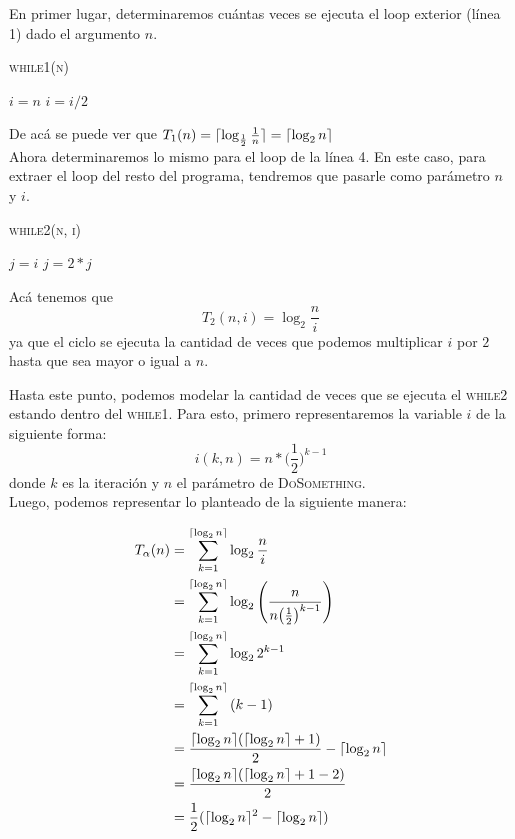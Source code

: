 \documentclass[12pt]{article}
\DeclarePairedDelimiter{\ceil}{\lceil}{\rceil}
\begin{document}
En primer lugar, determinaremos cuántas veces se ejecuta el loop exterior (línea 1) dado el argumento $n$. \\

\begin{algorithm}
\caption{\textsc{while1(n)}}
\begin{algorithmic}[1]
    \State $i = n$
        \State $i = i/2$
    \EndWhile
\end{algorithmic}
\end{algorithm}

De acá se puede ver que $T_1(n) = \ceil{\log_{\frac{1}{2}} \frac{1}{n}} = \ceil{\log_2 n} $\\


Ahora determinaremos lo mismo para el loop de la línea 4. En este caso, para extraer el loop del resto del programa, tendremos que pasarle como parámetro $n$ y $i$.

\newpage

\begin{algorithm}
\caption{\textsc{while2(n, i)}}
\begin{algorithmic}[1]
    \State $j = i$
        \State $j = 2 * j$
    \EndWhile
\end{algorithmic}
\end{algorithm}

Acá tenemos que 
$$T_2(n, i) = \log_2 \frac{n}{i}$$
ya que el ciclo se ejecuta la cantidad de veces que podemos multiplicar $i$ por $2$ hasta que sea mayor o igual a $n$.

Hasta este punto, podemos modelar la cantidad de veces que se ejecuta el \textsc{while2} estando dentro del \textsc{while1}. Para esto, primero representaremos la variable $i$ de la siguiente forma:
$$i(k, n) = n * \bigg( \frac{1}{2} \bigg)^{k-1}$$
donde $k$ es la iteración y $n$ el parámetro de \textsc{DoSomething}. \\
Luego, podemos representar lo planteado de la siguiente manera:

\begin{align*}
T_\alpha(n) &= \sum_{k=1}^{\ceil{\log_2 n}} \log_2 {\frac{n}{i}} \\
&= \sum_{k=1}^{\ceil{\log_2 n}} \log_2 {\Bigg( \frac{n}{n \big( \frac{1}{2} \big)^{k-1}} \Bigg)} \\
&= \sum_{k=1}^{\ceil{\log_2 n}} \log_2 {2^{k - 1}} \\ 
&= \sum_{k=1}^{\ceil{\log_2 n}} {(k - 1)} \\
&= \frac{\ceil{\log_2 n} (\ceil{\log_2 n} + 1)}{2} - \ceil{\log_2 n} \\
&= \frac{\ceil{\log_2 n} (\ceil{\log_2 n} + 1 - 2)}{2} \\
&= \frac{1}{2}(\ceil{\log_2 n}^2 - \ceil{\log_2 n})
\end{align*}
\end{document}
